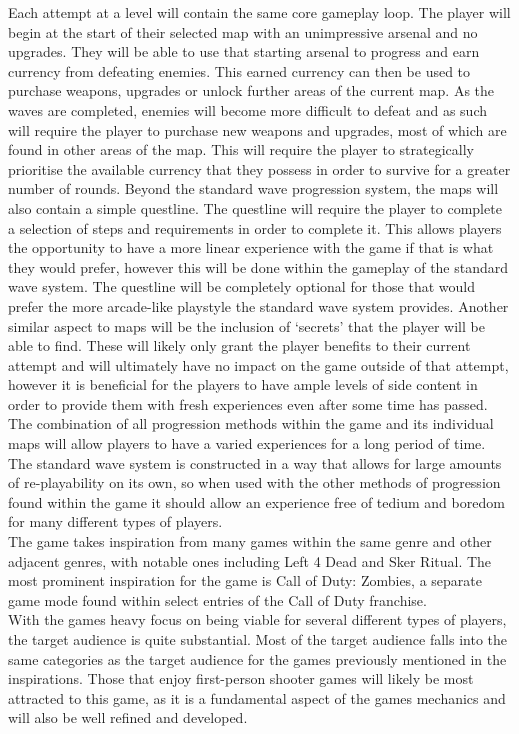 \documentclass[11pt]{article}
\begin{document}
Each attempt at a level will contain the same core gameplay loop. The player will begin at the start of their selected map with an unimpressive arsenal and no upgrades. They will be able to use that starting arsenal to progress and earn currency from defeating enemies. This earned currency can then be used to purchase weapons, upgrades or unlock further areas of the current map. As the waves are completed, enemies will become more difficult to defeat and as such will require the player to purchase new weapons and upgrades, most of which are found in other areas of the map. This will require the player to strategically prioritise the available currency that they possess in order to survive for a greater number of rounds. 
Beyond the standard wave progression system, the maps will also contain a simple questline. The questline will require the player to complete a selection of steps and requirements in order to complete it. This allows players the opportunity to have a more linear experience with the game if that is what they would prefer, however this will be done within the gameplay of the standard wave system. The questline will be completely optional for those that would prefer the more arcade-like playstyle the standard wave system provides.  
Another similar aspect to maps will be the inclusion of ‘secrets’ that the player will be able to find. These will likely only grant the player benefits to their current attempt and will ultimately have no impact on the game outside of that attempt, however it is beneficial for the players to have ample levels of side content in order to provide them with fresh experiences even after some time has passed.
The combination of all progression methods within the game and its individual maps will allow players to have a varied experiences for a long period of time. The standard wave system is constructed in a way that allows for large amounts of re-playability on its own, so when used with the other methods of progression found within the game it should allow an experience free of tedium and boredom for many different types of players. \\

The game takes inspiration from many games within the same genre and other adjacent genres, with notable ones including Left 4 Dead and Sker Ritual. The most prominent inspiration for the game is Call of Duty: Zombies, a separate game mode found within select entries of the Call of Duty franchise. \\

With the games heavy focus on being viable for several different types of players, the target audience is quite substantial. Most of the target audience falls into the same categories as the target audience for the games previously mentioned in the inspirations. Those that enjoy first-person shooter games will likely be most attracted to this game, as it is a fundamental aspect of the games mechanics and will also be well refined and developed.  \\
\end{document}
